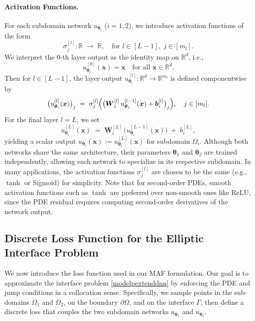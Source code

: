\documentclass{article}
\begin{document}
\paragraph{Activation Functions.}
For each subdomain network $u_{\boldsymbol{\theta}_i}$ ($i=1,2$), we introduce activation functions of the form
\[
\sigma_j^{[l]}: \mathbb{R} \;\to\; \mathbb{R}, 
\quad\text{for } l \in [L-1],\; j \in [m_l].
\]
We interpret the 0-th layer output as the identity map on $\mathbb{R}^d$, i.e., 
\[
u_{\boldsymbol{\theta}_i}^{[0]}(\boldsymbol{x}) = \boldsymbol{x}
\quad \text{for all } \boldsymbol{x} \in \mathbb{R}^d.
\]
Then for $l \in [L-1]$, the layer output $u_{\boldsymbol{\theta}_i}^{[l]}: \mathbb{R}^d \to \mathbb{R}^{m_l}$ is defined componentwise by
\begin{equation}
    \begin{aligned}
    \bigl(u_{\boldsymbol{\theta}_i}^{[l]}(\boldsymbol{x})\bigr)_j
    \;=\;
    \sigma_j^{[l]}
    \Bigl(\bigl(\boldsymbol{W}_i^{[l]}\,u_{\boldsymbol{\theta}_i}^{[l-1]}(\boldsymbol{x}) + \boldsymbol{b}_i^{[l]}\bigr)_j\Bigr),
    \quad j \in [m_l].
    \end{aligned}
\end{equation}
For the final layer $l = L$, we set
\begin{equation}
u_{\boldsymbol{\theta}_i}^{[L]}(\boldsymbol{x}) 
\;=\;
\boldsymbol{W}_i^{[L]} \,\bigl(u_{\boldsymbol{\theta}_i}^{[L-1]}(\boldsymbol{x})\bigr) \;+\; b_i^{[L]},
\end{equation}
yielding a scalar output $u_{\boldsymbol{\theta}_i}(\boldsymbol{x}) := u_{\boldsymbol{\theta}_i}^{[L]}(\boldsymbol{x})$ for subdomain $\Omega_i$. Although both networks share the same architecture, their parameters $\boldsymbol{\theta}_1$ and $\boldsymbol{\theta}_2$ are trained independently, allowing each network to specialize in its respective subdomain. In many applications, the activation functions $\sigma_j^{[l]}$ are chosen to be the same (e.g., $\tanh$ or Sigmoid) for simplicity. Note that for second-order PDEs, smooth activation functions such as $\tanh$ are preferred over non-smooth ones like ReLU, since the PDE residual requires computing second-order derivatives of the network output.

\subsection{Discrete Loss Function for the Elliptic Interface Problem}

We now introduce the loss function used in our MAF formulation. Our goal is to approximate the interface problem \eqref{modelpextenddnn} by enforcing the PDE and jump conditions in a collocation sense. Specifically, we sample points in the sub-domains $\Omega_1$ and $\Omega_2$, on the boundary $\partial \Omega$, and on the interface $\Gamma$, then define a discrete loss that couples the two subdomain networks $u_{\boldsymbol{\theta}_1}$ and $u_{\boldsymbol{\theta}_2}$.
\end{document}
